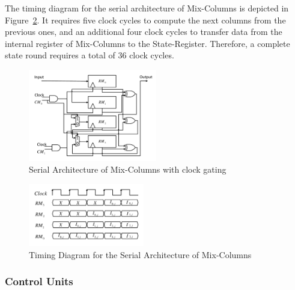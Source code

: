 \documentclass[final,5p,times,twocolumn]{elsarticle}
\begin{document}
The timing diagram for the serial architecture of Mix-Columns is depicted in Figure~\ref{serial_time_diagrm_mix_colunms}.
It requires five clock cycles to compute the next columns from the previous ones, and an additional four clock cycles to transfer data from the internal register of Mix-Columns to the State-Register.
Therefore, a complete state round requires a total of 36 clock cycles.


\begin{figure}[h]%
    \centering
    \includegraphics[width=0.5\textwidth]{./fig/Mix-Columns.pdf}
    \caption{Serial Architecture of Mix-Columns with clock gating}\label{serial_mix_columns_fig}
\end{figure}

\begin{figure}[h]%
    \centering
    \includegraphics[width=0.45\textwidth]{./fig/Mix-Columns-Times.pdf}
    \caption{Timing Diagram for the Serial Architecture of Mix-Columns }\label{serial_time_diagrm_mix_colunms}
\end{figure}

\subsubsection{Control Units}\label{subsubsec3}
\end{document}
